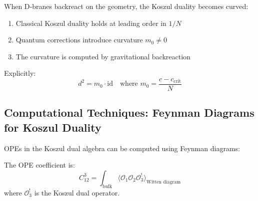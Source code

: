 \begin{theorem}\label{thm:curved-koszul}
When D-branes backreact on the geometry, the Koszul duality becomes curved:
\begin{enumerate}
\item Classical Koszul duality holds at leading order in $1/N$
\item Quantum corrections introduce curvature $m_0 \neq 0$
\item The curvature is computed by gravitational backreaction
\end{enumerate}

Explicitly:
$$d^2 = m_0 \cdot \text{id} \quad \text{where } m_0 = \frac{c - c_{\text{crit}}}{N}$$
\end{theorem}

\subsection{Computational Techniques: Feynman Diagrams for Koszul Duality}

\begin{technique}\label{tech:diagrams}
OPEs in the Koszul dual algebra can be computed using Feynman diagrams:

\begin{center}
\end{center}

The OPE coefficient is:
$$C_{12}^3 = \int_{\text{bulk}} \langle \mathcal{O}_1 \mathcal{O}_2 \mathcal{O}_3^! \rangle_{\text{Witten diagram}}$$
where $\mathcal{O}_3^!$ is the Koszul dual operator.
\end{technique}

